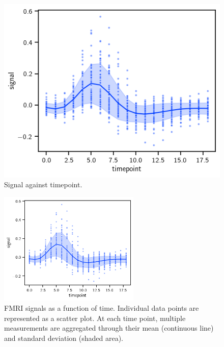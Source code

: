 \documentclass[
	german,
	accentcolor=9c,%
	type=intern,
	marginpar=false
	]{tudapub}
\begin{document}
\begin{figure}[htbp]         %
\centering                                              %
\includegraphics[width=\textwidth]{output.png} %
\caption{Signal against timepoint.}                         %
\label{fig:bad}                                      %
\end{figure}                                           %

\begin{figure}[h]                                    %
\centering                                              %
\includegraphics[width=0.6\textwidth]{output.png} %
\caption{FMRI signals as a function of time. Individual data points are represented as a scatter plot. At each time point, multiple measurements are aggregated through their mean (continuous line) and standard deviation (shaded area).}                         %
\label{fig:good}                                      %
\end{figure}                                           %
\end{document}
